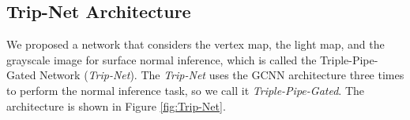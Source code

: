%
%
%


\subsection{Trip-Net Architecture}
We proposed a network that considers the vertex map, the light map, and the grayscale image for surface normal inference, which is called the Triple-Pipe-Gated Network (\textit{Trip-Net}). 
The \textit{Trip-Net} uses the GCNN architecture three times to perform the normal inference task, so we call it \textit{Triple-Pipe-Gated}. The architecture is shown in Figure \ref{fig:Trip-Net}.

